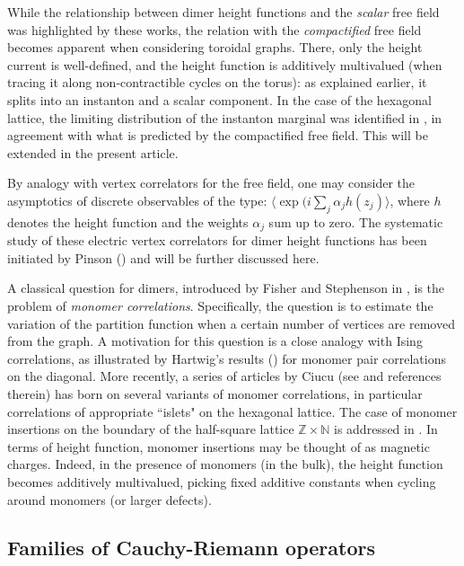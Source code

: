\documentclass[10pt]{article}
\newcommand{\Z}{\mathbb{Z}}
\newcommand{\N}{\mathbb{N}}
\begin{document}
While the relationship between dimer height functions and the {\em scalar} free field was highlighted by these works, the relation with the {\em compactified} free field becomes apparent when considering toroidal graphs. There, only the height current is well-defined, and the height function is additively multivalued (when tracing it along non-contractible cycles on the torus): as explained earlier, it splits into an instanton and a scalar component. In the case of the hexagonal lattice, 
the limiting distribution of the instanton marginal was identified in \cite{BdT_loop}, in agreement with what is predicted by the compactified free field. This will be extended in the present article.

By analogy with vertex correlators for the free field, one may consider the asymptotics of discrete observables of the type: $\langle\exp(i\sum_j\alpha_j h(z_j)\rangle$, where $h$ denotes the height function and the weights $\alpha_j$ sum up to zero. The systematic study of these electric vertex correlators for dimer height functions has been initiated by Pinson (\cite{Pinson_vertex}) and will be further discussed here.

A classical question for dimers, introduced by Fisher and Stephenson in \cite{FisSte2}, is the problem of {\em monomer correlations}. Specifically, the question is to estimate the variation of the partition function when a certain number of vertices are removed from the graph. A motivation for this question is a close analogy with Ising correlations, as illustrated by Hartwig's results (\cite{Hartwig_monomer}) for monomer pair correlations on the diagonal. More recently, a series of articles by Ciucu (see \cite{Ciucu_PNAS,Ciucu_TAMS} and references therein) has born on several variants of monomer correlations, in particular correlations of appropriate ``islets" on the hexagonal lattice. The case of monomer insertions on the boundary of the half-square lattice $\Z\times\N$ is addressed in \cite{PriRue_monomer}. In terms of height function, monomer insertions may be thought of as magnetic charges. Indeed, in the presence of monomers (in the bulk), the height function becomes additively multivalued, picking fixed additive constants when cycling around monomers (or larger defects).



\subsection{Families of Cauchy-Riemann operators}
\end{document}
